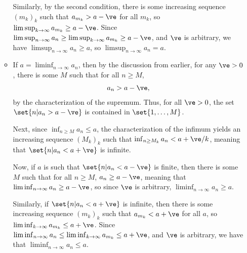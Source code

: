 \documentclass[10pt]{mypackage}
\begin{document}
\begin{enumerate}[(i)]
\begin{itemize}
        Similarly, by the second condition, there is some increasing sequence $\left( m_k \right)_k$ such that $a_{m_k} > a-\ve$ for all $m_k$, so $\limsup_{k\rightarrow\infty} a_{m_k} \geq a-\ve$. Since $\limsup_{n\rightarrow\infty} a_n \geq \limsup_{k\rightarrow\infty}a_{m_k}\geq a-\ve$, and $\ve$ is arbitrary, we have $\limsup_{n\rightarrow\infty}a_n \geq a$, so $\limsup_{n\rightarrow\infty} a_n = a$.
      \item If $a = \liminf_{n\rightarrow\infty} a_n$, then by the discussion from earlier, for any $\ve > 0$, there is some $M$ such that for all $n\geq M$,
        \begin{align*}
          a_n > a-\ve,
        \end{align*}
        by the characterization of the supremum. Thus, for all $\ve > 0$, the set $\set{n | a_n > a-\ve}$ is contained in $\set{1,\dots,M}$.\newline

        Next, since $\inf_{n\geq M}a_n \leq a$, the characterization of the infimum yields an increasing sequence $\left( M_k \right)_k$ such that $\inf_{n\geq M_k} a_n < a + \ve/k$, meaning that $\set{n | a_n < a + \ve}$ is infinite.\newline

        Now, if $a$ is such that $\set{n | a_n < a-\ve}$ is finite, then there is some $M$ such that for all $n\geq M$, $a_n \geq a-\ve$, meaning that $\liminf_{n\rightarrow\infty}a_n \geq a-\ve$, so since $\ve$ is arbitrary, $\liminf_{n\rightarrow\infty}a_n \geq a$.\newline

        Similarly, if $\set{n | a_n < a+\ve}$ is infinite, then there is some increasing sequence $\left( m_k \right)_k$ such that $a_{m_k} < a+\ve$ for all $a$, so $\liminf_{k\rightarrow\infty}a_{m_k} \leq a+\ve$. Since $\liminf_{n\rightarrow\infty}a_n \leq \liminf_{k\rightarrow\infty}a_{m_k} \leq a + \ve$, and $\ve$ is arbitrary, we have that $\liminf_{n\rightarrow\infty}a_n \leq a$.
    \end{itemize}
\end{enumerate}
\end{document}

